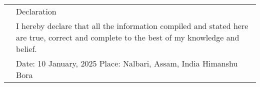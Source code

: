\documentclass[a4paper, 11pt]{article}
\newcommand{\headingfont}{\Large\color{Bittersweet}}
\newenvironment{SectionTable}[1]{
	\renewcommand*{\arraystretch}{1.7}
	\setlength{\tabcolsep}{10pt}
	\begin{longtable}{Rp{5.2in}} & #1 \\}
{\end{longtable}\vspace{-.3cm}}
\begin{document}
\begin{SectionTable}{\headingfont Declaration}
& I hereby declare that all the information compiled and stated here are true, correct and complete to the best of my knowledge and belief. \\



& Date: 	10 January, 2025	\newline							          
Place:	 Nalbari, Assam, India \hfill  Himanshu Bora \\
\end{SectionTable}

\end{document}
